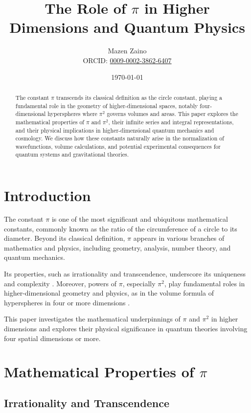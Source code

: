 \documentclass[12pt,a4paper]{article}
\title{The Role of \(\pi\) in Higher Dimensions and Quantum Physics}
\author{Mazen Zaino \\ ORCID: \href{https://orcid.com/0009-0002-3862-6407}{0009-0002-3862-6407}}
\date{\today}
\begin{document}
\maketitle

\begin{abstract}
The constant \(\pi\) transcends its classical definition as the circle constant, playing a fundamental role in the geometry of higher-dimensional spaces, notably four-dimensional hyperspheres where \(\pi^{2}\) governs volumes and areas. This paper explores the mathematical properties of \(\pi\) and \(\pi^{2}\), their infinite series and integral representations, and their physical implications in higher-dimensional quantum mechanics and cosmology. We discuss how these constants naturally arise in the normalization of wavefunctions, volume calculations, and potential experimental consequences for quantum systems and gravitational theories.
\end{abstract}
\tableofcontents
\newpage

\section{Introduction}

The constant \(\pi\) is one of the most significant and ubiquitous mathematical constants, commonly known as the ratio of the circumference of a circle to its diameter. Beyond its classical definition, \(\pi\) appears in various branches of mathematics and physics, including geometry, analysis, number theory, and quantum mechanics.

Its properties, such as irrationality and transcendence, underscore its uniqueness and complexity \cite{lindemann-transcendence}. Moreover, powers of \(\pi\), especially \(\pi^{2}\), play fundamental roles in higher-dimensional geometry and physics, as in the volume formula of hyperspheres in four or more dimensions \cite{hypersphere-volume-formula, pi2-4d-volume}.

This paper investigates the mathematical underpinnings of \(\pi\) and \(\pi^{2}\) in higher dimensions and explores their physical significance in quantum theories involving four spatial dimensions or more.

\section{Mathematical Properties of \(\pi\)}

\subsection{Irrationality and Transcendence}
\end{document}
